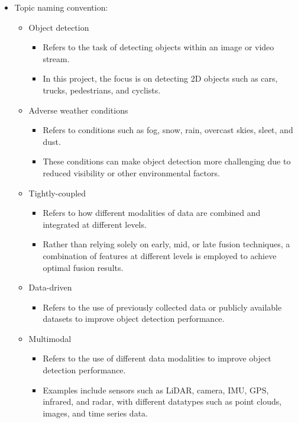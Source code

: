 \documentclass[rnd]{mas_proposal}
\begin{document}
\begin{itemize}
    \item Topic naming convention:
          \begin{itemize}
              \item Object detection
                    \begin{itemize}
                        \item Refers to the task of detecting objects within an image or video stream.
                        \item In this project, the focus is on detecting 2D objects such as cars, trucks, pedestrians, and cyclists.
                    \end{itemize}
              \item Adverse weather conditions
                    \begin{itemize}
                        \item Refers to conditions such as fog, snow, rain, overcast skies, sleet, and dust.
                        \item These conditions can make object detection more challenging due to reduced visibility or other environmental factors.
                    \end{itemize}
              \item Tightly-coupled
                    \begin{itemize}
                        \item Refers to how different modalities of data are combined and integrated at different levels.
                        \item Rather than relying solely on early, mid, or late fusion techniques, a combination of features at different levels is employed to achieve optimal fusion results.
                    \end{itemize}
              \item Data-driven
                    \begin{itemize}
                        \item Refers to the use of previously collected data or publicly available datasets to improve object detection performance.
                    \end{itemize}
              \item Multimodal
                    \begin{itemize}
                        \item Refers to the use of different data modalities to improve object detection performance.
                        \item Examples include sensors such as LiDAR, camera, IMU, GPS, infrared, and radar, with different datatypes such as point clouds, images, and time series data.

\end{itemize}
\end{itemize}
\end{itemize}
\end{document}
